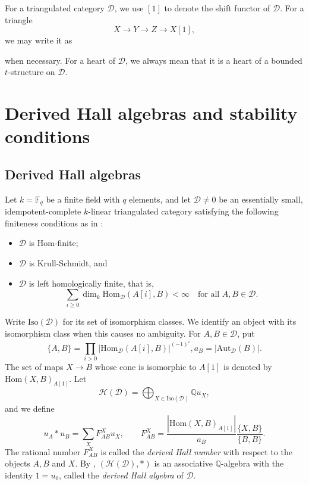 \documentclass[a4paper,12pt]{amsart}
\numberwithin{equation}{section}
\newcommand{\Aut}{\mathrm{Aut}}
\newcommand{\Hom}{\mathrm{Hom}}
\newcommand{\Iso}{\mathrm{Iso}}
\newcommand{\1}{\mathbf{1}}
\begin{document}
    For a triangulated category $\mathcal{D}$, we use $[1]$ to denote the shift functor of $\mathcal{D}$. For a triangle
    \[X\rightarrow Y\rightarrow Z\rightarrow X[1],\]
    we may write it as
    \begin{center}
    \end{center}
    when necessary. For a heart of $\mathcal{D}$, we always mean that it is a heart of a bounded $t$-structure on $\mathcal{D}$.
\section{Derived Hall algebras and stability conditions}
\subsection{Derived Hall algebras}
Let $k=\mathbb{F}_q$ be a finite field with $q$ elements, and let $\mathcal{D}\neq0$ be an essentially small, idempotent-complete $k$-linear triangulated category satisfying the following finiteness conditions as in \cite{XX2008}:
\begin{itemize}
    \item $\mathcal{D}$ is Hom-finite;
    \item $\mathcal{D}$ is Krull-Schmidt, and
    \item $\mathcal{D}$ is left homologically finite, that is,
    \begin{equation}\label{eq:leftfinite}
 \sum_{i\geq0}\dim_k\Hom_{\mathcal{D}}(A[i],B)<\infty
 \quad\text{for all }A,B\in\mathcal{D}.
\end{equation}
\end{itemize}

Write $\Iso(\mathcal{D})$ for its set of isomorphism classes. We identify an object with its isomorphism class when this causes no ambiguity. For $A,B\in\mathcal{D}$, put
\[
 \{A,B\}=\prod_{i>0}|\Hom_{\mathcal{D}}(A[i],B)|^{(-1)^i},
 a_B=|\Aut_{\mathcal{D}}(B)|.
\]
The set of maps $X\rightarrow B$ whose cone is isomorphic to $A[1]$ is denoted by $\Hom(X,B)_{A[1]}$. Let
\[\mathcal{H}(\mathcal{D})=\bigoplus_{X\in\Iso(\mathcal{D})}\mathbb{Q}u_X,\]
and we define
\begin{equation}\label{eq:Hall}
 u_A*u_B=\sum_X F^X_{AB}u_X,\qquad
 F^X_{AB}=\frac{|\Hom(X,B)_{A[1]}|}{a_B}
              \frac{\{X,B\}}{\{B,B\}}.
\end{equation}
The rational number $F^X_{AB}$ is called the \emph{derived Hall number} with respect to the objects $A,B$ and $X$. 
By \cite[Theorem 3.6]{XX2008}, $(\mathcal{H}(\mathcal{D}),*)$ is an associative $\mathbb{Q}$-algebra with the identity $1=u_0$, called the \emph{derived Hall algebra} of $\mathcal{D}$.
\end{document}
